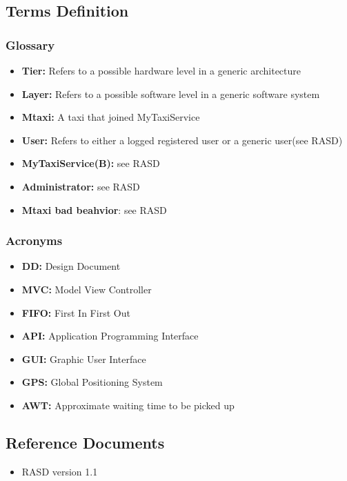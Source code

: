 \documentclass[11pt,titlepage]{article} %
\begin{document}
\subsection{Terms Definition}
	\subsubsection{Glossary}
		\begin{itemize}
			\item \textbf{Tier:} Refers to a possible hardware level in a generic architecture
	        		\item \textbf{Layer:} Refers to a possible software level in a generic software system
			\item \textbf{Mtaxi:} A taxi that joined MyTaxiService
			\item \textbf{User:} Refers to either a logged registered user or a generic user(see RASD)
			\item \textbf{MyTaxiService(B):} see RASD
			\item \textbf{Administrator:} see RASD
			\item \textbf{Mtaxi bad beahvior}: see RASD
		\end{itemize}
	\subsubsection{Acronyms}
		\begin{itemize}
		        \item \textbf{DD:} Design Document
		        \item \textbf{MVC:} Model View Controller
		        \item \textbf{FIFO:} First In First Out
		        \item \textbf{API:} Application Programming Interface
		        \item \textbf{GUI:} Graphic User Interface
		        \item \textbf{GPS:} Global Positioning System
		        \item \textbf{AWT:} Approximate waiting time to be picked up
		\end{itemize}
		

\subsection{Reference Documents}
	\begin{itemize}
		\item RASD version 1.1
	\end{itemize}
\end{document}
